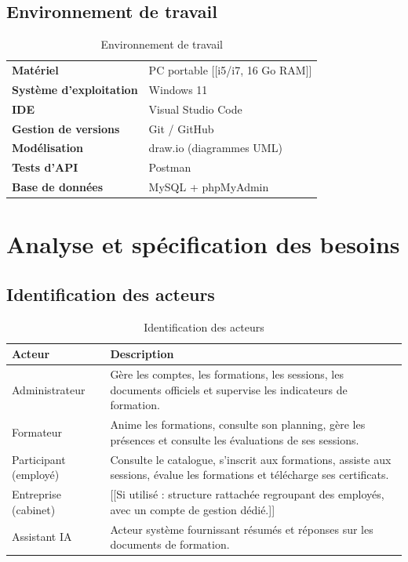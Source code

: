 \documentclass[12pt,a4paper]{report}
\begin{document}
\section{Environnement de travail}
\begin{table}[H]
\centering
\begin{tabular}{p{4.5cm} p{8.5cm}}
\toprule
\textbf{Matériel} & PC portable [[i5/i7, 16 Go RAM]] \\
\textbf{Système d'exploitation} & Windows 11 \\
\textbf{IDE} & Visual Studio Code \\
\textbf{Gestion de versions} & Git / GitHub \\
\textbf{Modélisation} & draw.io (diagrammes UML) \\
\textbf{Tests d'API} & Postman \\
\textbf{Base de données} & MySQL + phpMyAdmin \\
\bottomrule
\end{tabular}
\caption{Environnement de travail}
\end{table}

\chapter{Analyse et spécification des besoins}

\section{Identification des acteurs}
\begin{table}[H]
\centering
\begin{tabular}{p{3.5cm} p{9.5cm}}
\toprule
\textbf{Acteur} & \textbf{Description} \\
\midrule
Administrateur & Gère les comptes, les formations, les sessions, les
documents officiels et supervise les indicateurs de formation. \\
Formateur & Anime les formations, consulte son planning, gère les présences
et consulte les évaluations de ses sessions. \\
Participant (employé) & Consulte le catalogue, s'inscrit aux formations,
assiste aux sessions, évalue les formations et télécharge ses certificats. \\
Entreprise (cabinet) & [[Si utilisé : structure rattachée regroupant des
employés, avec un compte de gestion dédié.]] \\
Assistant IA & Acteur système fournissant résumés et réponses sur les
documents de formation. \\
\bottomrule
\end{tabular}
\caption{Identification des acteurs}
\end{table}
\end{document}
